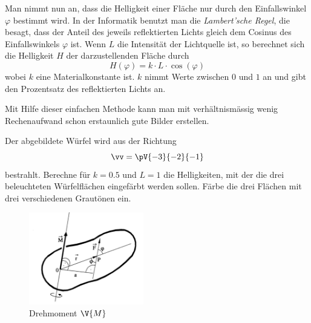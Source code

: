 \documentclass[%
11pt,%
twoside,%
titlepage,%
german,%
headsepline%
]{scrartcl}
\begin{document}
Man nimmt nun an, dass die Helligkeit einer Fläche nur durch den Einfallswinkel $\varphi$ bestimmt wird. In der Informatik benutzt man die \emph{Lambert'sche Regel}, die besagt, dass der Anteil des jeweils reflektierten Lichts gleich dem Cosinus des Einfallswinkels $\varphi$ ist.
Wenn $L$ die Intensität der Lichtquelle ist, so berechnet sich die Helligkeit $H$ der darzustellenden Fläche durch
$$H(\varphi)=k\cdot L\cdot\cos(\varphi)$$
wobei $k$ eine Materialkonstante ist. $k$ nimmt Werte zwischen $0$ und $1$ an und gibt den Prozentsatz des reflektierten Lichts an.

Mit Hilfe dieser einfachen Methode kann man mit verhältnismässig wenig Rechenaufwand schon erstaunlich gute Bilder erstellen.

\begin{ueb}[Lambert]
Der abgebildete Würfel wird aus der Richtung
$$\vv=\pV{-3}{-2}{-1}$$
bestrahlt. Berechne für $k=0.5$ und $L=1$ die Helligkeiten, mit der die drei beleuchteten Würfelflächen eingefärbt werden sollen. Färbe die drei Flächen mit drei verschiedenen Grautönen ein.
\begin{center}
\end{center}
\end{ueb}

\begin{figure}[ht]
\begin{center}
\includegraphics[width=5cm]{pictures/vprodukt}
\end{center}
\caption{Drehmoment $\V{M}$}\label{abb:vektorprod}
\end{figure}
\end{document}
